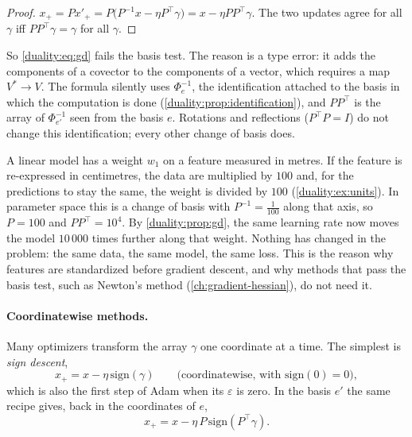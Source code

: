 \begin{notechapter}
\begin{proof}
$x_+ = Px'_+ = P\bigl(P^{-1}x - \eta P^\top\gamma\bigr)
= x - \eta PP^\top\gamma$. The two updates agree for all $\gamma$ iff
$PP^\top\gamma = \gamma$ for all $\gamma$.
\end{proof}

So \eqref{duality:eq:gd} fails the basis test. The reason is a type error:
it adds the components of a covector to the components of a vector, which
requires a map $V^*\to V$. The formula silently uses $\Phi_e^{-1}$, the
identification attached to the basis in which the computation is done
(\cref{duality:prop:identification}), and $PP^\top$ is the array of
$\Phi_{e'}^{-1}$ seen from the basis $e$. Rotations and reflections
($P^\top P = I$) do not change this identification; every other change of
basis does.

\begin{example}\label{duality:ex:feature}
A linear model has a weight $w_1$ on a feature measured in metres. If the
feature is re-expressed in centimetres, the data are multiplied by $100$
and, for the predictions to stay the same, the weight is divided by $100$
(\cref{duality:ex:units}). In parameter space this is a change of basis
with $P^{-1} = \frac1{100}$ along that axis, so $P = 100$ and
$PP^\top = 10^4$. By \cref{duality:prop:gd}, the same learning rate now
moves the model $10\,000$ times further along that weight. Nothing has
changed in the problem: the same data, the same model, the same loss.
This is the reason why features are standardized before gradient descent,
and why methods that pass the basis test, such as Newton's method
(\cref{ch:gradient-hessian}), do not need it.
\end{example}

\paragraph{Coordinatewise methods.} Many optimizers transform the array
$\gamma$ one coordinate at a time. The simplest is \emph{sign descent},
\begin{equation}\label{duality:eq:sign}
  x_+ = x - \eta\,\mathrm{sign}(\gamma)
  \qquad\text{(coordinatewise, with } \mathrm{sign}(0) = 0\text{)},
\end{equation}
which is also the first step of Adam when its $\varepsilon$ is zero. In
the basis $e'$ the same recipe gives, back in the coordinates of $e$,
\[
  x_+ = x - \eta\,P\,\mathrm{sign}(P^\top\gamma) .
\]


\end{notechapter}

